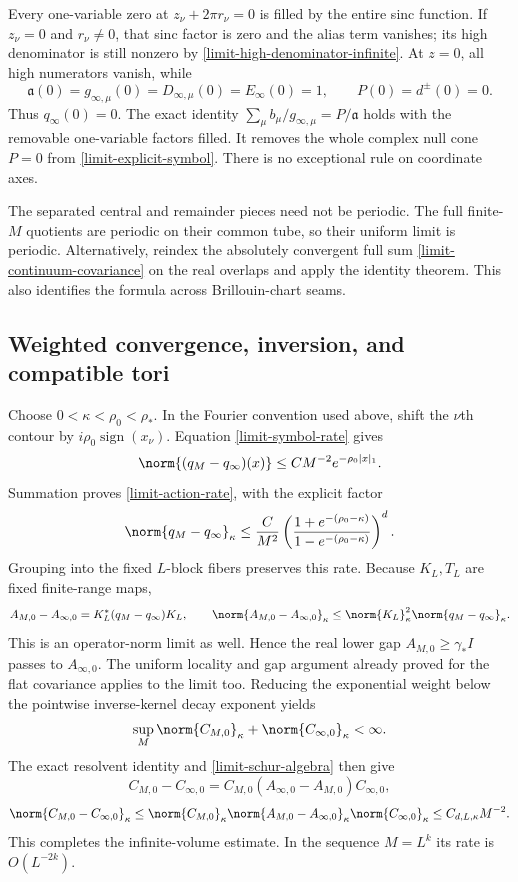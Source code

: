 Every one-variable zero at $z_\nu+2\pi r_\nu=0$ is filled by the
entire sinc function. If $z_\nu=0$ and $r_\nu\ne0$, that sinc
factor is zero and the alias term vanishes; its high denominator is
still nonzero by \eqref{limit-high-denominator-infinite}. At $z=0$,
all high numerators vanish, while
\[
 \mathfrak a(0)=g_{\infty,\mu}(0)
 =D_{\infty,\mu}(0)=E_\infty(0)=1,
 \qquad P(0)=d^\pm(0)=0.
\]
Thus $q_\infty(0)=0$. The exact identity
$\sum_\mu b_\mu/g_{\infty,\mu}=P/\mathfrak a$ holds with
the removable one-variable factors filled. It removes the whole
complex null cone $P=0$ from \eqref{limit-explicit-symbol}.
There is no exceptional rule on coordinate axes.

The separated central and remainder pieces need not be periodic.
The full finite-$M$ quotients are periodic on their common tube,
so their uniform limit is periodic. Alternatively, reindex the
absolutely convergent full sum \eqref{limit-continuum-covariance}
on the real overlaps and apply the identity theorem. This also
identifies the formula across Brillouin-chart seams.

\subsection{Weighted convergence, inversion, and compatible tori}

Choose $0<\kappa<\rho_0<\rho_*$. In the Fourier convention used
above, shift the $\nu$th contour by $i\rho_0\operatorname{sign}(x_\nu)$.
Equation \eqref{limit-symbol-rate} gives
\[
 \norm{(q_M-q_\infty)(x)}
 \le CM^{-2}e^{-\rho_0|x|_1}.
\]
Summation proves \eqref{limit-action-rate}, with the explicit factor
\begin{equation}\label{limit-weighted-rate}
 \norm{q_M-q_\infty}_\kappa
 \le\frac{C}{M^2}
 \left(\frac{1+e^{-(\rho_0-\kappa)}}
            {1-e^{-(\rho_0-\kappa)}}\right)^d.
\end{equation}
Grouping into the fixed $L$-block fibers preserves this rate.
Because $K_L,T_L$ are fixed finite-range maps,
\[
 A_{M,0}-A_{\infty,0}=K_L^*(q_M-q_\infty)K_L,
 \qquad
 \norm{A_{M,0}-A_{\infty,0}}_\kappa
 \le\norm{K_L}_\kappa^2\norm{q_M-q_\infty}_\kappa.
\]
This is an operator-norm limit as well. Hence the real lower gap
$A_{M,0}\ge\gamma_*I$ passes to $A_{\infty,0}$.
The uniform locality and gap argument already proved for the flat
covariance applies to the limit too. Reducing the exponential weight
below the pointwise inverse-kernel decay exponent yields
\[
 \sup_M\norm{C_{M,0}}_\kappa+\norm{C_{\infty,0}}_\kappa<\infty.
\]
The exact resolvent identity and \eqref{limit-schur-algebra} then give
\[
 C_{M,0}-C_{\infty,0}
 =C_{M,0}(A_{\infty,0}-A_{M,0})C_{\infty,0},
\]
\[
 \norm{C_{M,0}-C_{\infty,0}}_\kappa
 \le\norm{C_{M,0}}_\kappa
     \norm{A_{M,0}-A_{\infty,0}}_\kappa
     \norm{C_{\infty,0}}_\kappa
 \le C_{d,L,\kappa}M^{-2}.
\]
This completes the infinite-volume estimate. In the sequence $M=L^k$
its rate is $O(L^{-2k})$.

